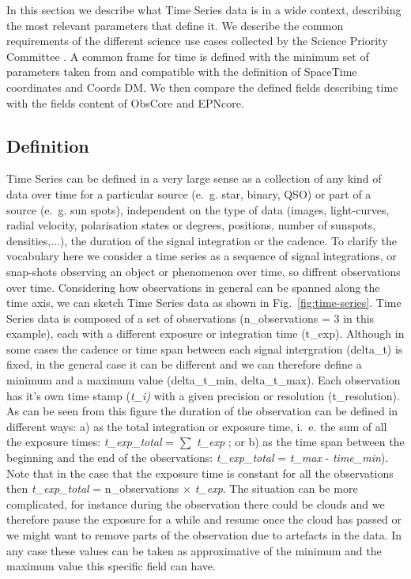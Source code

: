 \documentclass[11pt,a4paper]{ivoa}
\begin{document}
In this section we describe what Time Series data is in a wide context, describing the most relevant parameters that define it. We describe the common requirements of the different science use cases collected by the Science Priority Committee \cite{SPC_UC}. A common frame for time is defined with the minimum set of parameters taken from and compatible with the definition of SpaceTime coordinates and Coords DM. We then compare the defined fields describing time with the fields content of ObsCore and EPNcore. 

\subsection{Definition}
Time Series can be defined in a very large sense as a collection of any kind of data over time for a particular source (e.~g. star, binary, QSO) or part of a source (e.~g. sun spots), independent on the type of data (images, light-curves, radial velocity, polarisation states or degrees, positions, number of sunspots, densities,...), the duration of the signal integration or the cadence. 
To clarify the vocabulary here we consider a time series as a sequence of signal integrations, or snap-shots observing  an object or phenomenon over time, so diffrent observations over time. 
Considering how observations in general can be spanned along the time axis, we can sketch Time Series data as shown in Fig.~\ref{fig:time-series}. Time Series data is composed of a set of observations (n\_observations = 3 in this example), each with a different exposure or integration time (t\_exp). Although in some cases the cadence or time span between each signal intergration (delta\_t) is fixed, in the general case it can be different and we can therefore define a minimum and a maximum value (delta\_t\_min, delta\_t\_max). Each observation has it's own time stamp (\emph{t\_i)} with a given precision or resolution (t\_resolution). As can be seen from this figure the duration of the observation can be defined in different ways: a) as the total integration or exposure time, i.~e. the sum of all the exposure times: \emph{t\_exp\_total }= $\sum$ \emph{t\_exp} ; or b) as the time span between the beginning and the end of the observations: \emph{t\_exp\_total} = \emph{t\_max} - \emph{time\_min}). Note that in the case that the exposure time is constant for all the observations then \emph{t\_exp\_total }= n\_observations $\times$ \emph{t\_exp}. The situation can be more complicated, for instance during the observation there could be clouds and we therefore pause the exposure for a while and resume once the cloud has passed or we might want to remove parts of the observation due to artefacts in the data. In any case these values can be taken as approximative of the minimum and the maximum value this specific field can have. 
\end{document}
